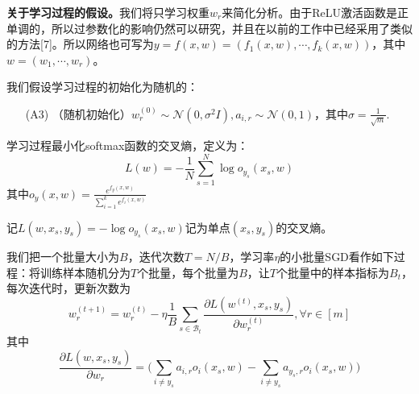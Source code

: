 \par
\textbf{关于学习过程的假设。}我们将只学习权重$w_r$来简化分析。由于ReLU激活函数是正单调的，所以过参数化的影响仍然可以研究，并且在以前的工作中已经采用了类似的方法[7]。所以网络也可写为$y = f(x,w) = (f_1(x,w),\cdots,f_k(x,w))$，其中$w = (w_1,\cdots, w_r)$。
\par
我们假设学习过程的初始化为随机的：
\begin{itemize}
  \item[(A3)]（随机初始化）$w_r^{(0)}\sim \mathcal{N}(0,\sigma^2I), a_{i,r} \sim \mathcal{N}(0,1)$，其中$\sigma = \frac{1}{\sqrt{m}}$.
\end{itemize}
\par
学习过程最小化softmax函数的交叉熵，定义为：
\[
L(w) = -\frac{1}{N}\sum_{s = 1}^N \log o_{y_s}(x_s,w)
\]
其中$o_y(x,w) = \frac{e^{f_y(x,w)}}{\sum_{i=1}^k e^{f_i(x,w)}}$
\par
记$L(w,x_s,y_s) = -\log o_{y_s}(x_s,w)$记为单点$(x_s,y_s)$的交叉熵。
\par
我们把一个批量大小为$B$，迭代次数$T=N/B$，学习率$\eta$的小批量SGD看作如下过程：将训练样本随机分为$T$个批量，每个批量为$B$，让$T$个批量中的样本指标为$B_t$，每次迭代时，更新次数为
\[
w_r^{(t+1)} = w_r^{(t)} -\eta\frac{1}{B}\sum_{s\in \mathcal{B}_t} \frac{\partial L(w^{(t)},x_s,y_s)}{\partial w_r^{(t)}}, \forall r \in [m]
\]
其中
\[
\frac{\partial L(w,x_s,y_s)}{\partial w_r} = \bigg(\sum_{i\neq y_s} a_{i,r}o_i(x_s,w)-\sum_{i\neq y_s} a_{y_s,r}o_i(x_s,w)\bigg)
\]



